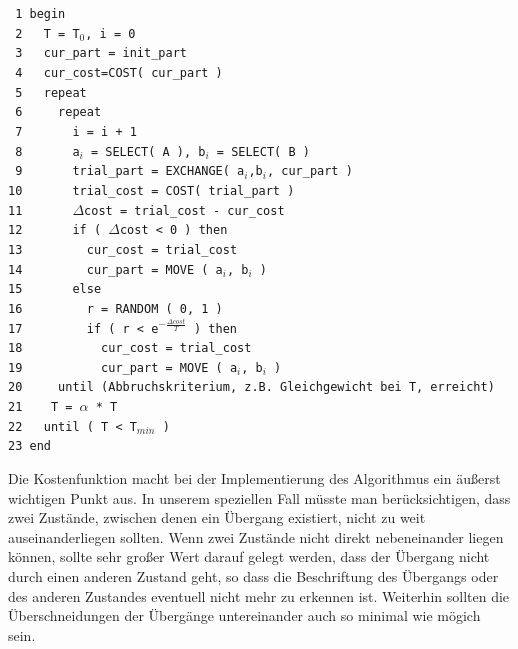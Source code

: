 \noindent
\verb| 1 begin|\\
\verb| 2   T = T|$_0$\verb|, i = 0|\\
\verb| 3   cur_part = init_part|\\
\verb| 4   cur_cost=COST( cur_part )|\\
\verb| 5   repeat|\\
\verb| 6     repeat|\\
\verb| 7       i = i + 1|\\
\verb| 8       a|$_i$\verb| = SELECT( A ), b|$_i$\verb| = SELECT( B )|\\
\verb| 9       trial_part = EXCHANGE( a|$_i$\verb|,b|$_i$\verb|, cur_part )|\\
\verb|10       trial_cost = COST( trial_part )|\\
\verb|11       |$\Delta$\verb|cost = trial_cost - cur_cost|\\
\verb|12       if ( |$\Delta$\verb|cost < 0 ) then|\\
\verb|13         cur_cost = trial_cost|\\
\verb|14         cur_part = MOVE ( a|$_i$\verb|, b|$_i$\verb| )|\\
\verb|15       else|\\
\verb|16         r = RANDOM ( 0, 1 )|\\
\verb|17         if ( r < e|$^{-\frac{\Delta cost}{T}}$\verb| ) then|\\
\verb|18           cur_cost = trial_cost|\\
\verb|19           cur_part = MOVE ( a|$_i$\verb|, b|$_i$\verb| )|\\
\verb|20     until (Abbruchskriterium, z.B. Gleichgewicht bei T, erreicht)|\\
\verb|21    T = |$\alpha$\verb| * T|\\
\verb|22   until ( T < T|$_{min}$\verb| )|\\
\verb|23 end|\\ 
\vspace{10pt}

Die Kostenfunktion macht bei der Implementierung des Algorithmus ein äußerst
wichtigen Punkt aus. In unserem speziellen Fall müsste man berücksichtigen,
dass zwei Zustände, zwischen denen ein Übergang existiert, nicht zu weit
auseinanderliegen sollten. Wenn zwei Zustände nicht direkt nebeneinander liegen
können, sollte sehr großer Wert darauf gelegt werden, dass der Übergang nicht
durch einen anderen Zustand geht, so dass die Beschriftung des Übergangs oder
des anderen Zustandes eventuell nicht mehr zu erkennen ist. Weiterhin sollten
die Überschneidungen der Übergänge untereinander auch so minimal wie mögich
sein. \vspace{10pt}
